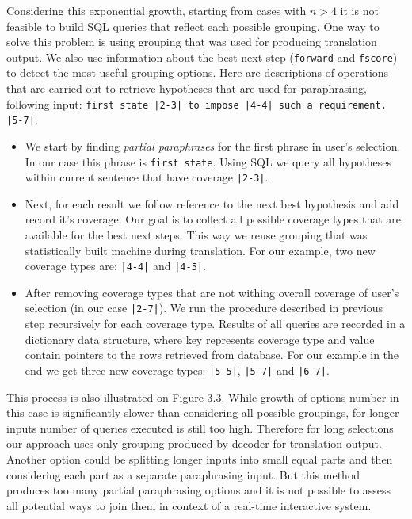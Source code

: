 Considering this exponential growth, starting from cases with $n > 4$ it is not feasible to build SQL queries that reflect each possible grouping. One way to solve this problem is using grouping that was used for producing translation output. We also use information about the best next step (\texttt{forward} and \texttt{fscore}) to detect the most useful grouping options. Here are descriptions of operations that are carried out to retrieve hypotheses that are used for paraphrasing, following input: \texttt{first state |2-3| to impose |4-4| such a requirement. |5-7|}.

\begin{itemize}
	\item We start by finding \emph{partial paraphrases} for the first phrase in user's selection. In our case this phrase is \texttt{first state}. Using SQL we query all hypotheses within current sentence that have coverage \texttt{|2-3|}. 
	\item Next, for each result we follow reference to the next best hypothesis and add record it's coverage. Our goal is to collect all possible coverage types that are available for the best next steps. This way we reuse grouping that was statistically built machine during translation. For our example, two new coverage types are: \texttt{|4-4|} and \texttt{|4-5|}.
	\item After removing coverage types that are not withing overall coverage of user's selection (in our case \texttt{|2-7|}). We run the procedure described in previous step recursively for each coverage type. Results of all queries are recorded in a dictionary data structure, where key represents coverage type and value contain pointers to the rows retrieved from database. For our example in the end we get three new coverage types: \texttt{|5-5|}, \texttt{|5-7|} and \texttt{|6-7|}. 
\end{itemize}

This process is also illustrated on Figure 3.3. While growth of options number in this case is significantly slower than considering all possible groupings, for longer inputs number of queries executed is still too high. Therefore for long selections our approach uses only grouping produced by decoder for translation output. Another option could be splitting longer inputs into small equal parts and then considering each part as a separate paraphrasing input. But this method produces too many partial paraphrasing options and it is not possible to assess all potential ways to join them in context of a real-time interactive system. 
 

